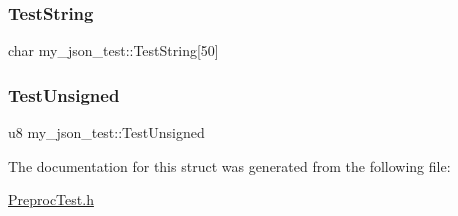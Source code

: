 \mbox{\label{structmy__json__test_a497da009ff7ce7742cf99571b0752227}} 
\subsubsection{\texorpdfstring{Test\+String}{TestString}}
{\footnotesize\ttfamily char my\+\_\+json\+\_\+test\+::\+Test\+String\mbox{[}50\mbox{]}}

\mbox{\label{structmy__json__test_a0ea8af0c0061131955753275ad70dba4}} 
\subsubsection{\texorpdfstring{Test\+Unsigned}{TestUnsigned}}
{\footnotesize\ttfamily u8 my\+\_\+json\+\_\+test\+::\+Test\+Unsigned}



The documentation for this struct was generated from the following file\+:\begin{DoxyCompactItemize}
\item 
\hyperlink{PreprocTest_8h}{Preproc\+Test.\+h}\end{DoxyCompactItemize}
